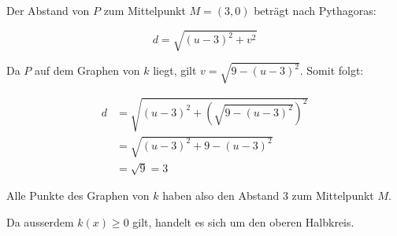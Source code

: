 \begin{enumerate}
\begin{enumerate}
                    Der Abstand von \(P\) zum Mittelpunkt \(M=(3, 0)\)
                    beträgt nach Pythagoras:

                    \[
                        d=\sqrt{(u-3)^2+v^2}
                    \]

                    Da \(P\) auf dem Graphen von \(k\) liegt, gilt
                    \(v=\sqrt{9-(u-3)^2}\). Somit folgt:

                    \begin{align*}
                        d & = \sqrt{(u-3)^2+
                                  \left(\sqrt{9-(u-3)^2}\right)^2} \\
                          & = \sqrt{(u-3)^2+9-(u-3)^2}             \\
                          & = \sqrt{9}=3
                    \end{align*}

                    Alle Punkte des Graphen von \(k\) haben also
                    den Abstand \(3\) zum Mittelpunkt \(M\).

                    Da ausserdem \(k(x)\geq 0\) gilt,
                    handelt es sich um den oberen Halbkreis.
          \end{enumerate}
\end{enumerate}